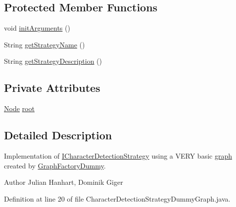 \subsection*{Protected Member Functions}
\begin{DoxyCompactItemize}
\item 
void \hyperlink{classch_1_1zhaw_1_1ba10__bsha__1_1_1strategies_1_1CharacterDetectionStrategyDummyGraph_a84843ef20f7ffcce6cc07b9c54ae179a}{initArguments} ()
\item 
String \hyperlink{classch_1_1zhaw_1_1ba10__bsha__1_1_1strategies_1_1CharacterDetectionStrategyDummyGraph_a8daf8f26a2d43d7b8e8e7be71e1edae5}{getStrategyName} ()
\item 
String \hyperlink{classch_1_1zhaw_1_1ba10__bsha__1_1_1strategies_1_1CharacterDetectionStrategyDummyGraph_a5cb3260ddc362ed0979fa45d927c5be0}{getStrategyDescription} ()
\end{DoxyCompactItemize}
\subsection*{Private Attributes}
\begin{DoxyCompactItemize}
\item 
\hyperlink{classch_1_1zhaw_1_1ba10__bsha__1_1_1graph_1_1Node}{Node} \hyperlink{classch_1_1zhaw_1_1ba10__bsha__1_1_1strategies_1_1CharacterDetectionStrategyDummyGraph_a734b7506e0104434524a5cb0db0ad7d4}{root}
\end{DoxyCompactItemize}


\subsection{Detailed Description}
Implementation of \hyperlink{interfacech_1_1zhaw_1_1ba10__bsha__1_1_1strategies_1_1ICharacterDetectionStrategy}{ICharacterDetectionStrategy} using a VERY basic \hyperlink{namespacech_1_1zhaw_1_1ba10__bsha__1_1_1graph}{graph} created by \hyperlink{}{GraphFactoryDummy}.

\begin{DoxyAuthor}{Author}
Julian Hanhart, Dominik Giger 
\end{DoxyAuthor}


Definition at line 20 of file CharacterDetectionStrategyDummyGraph.java.

